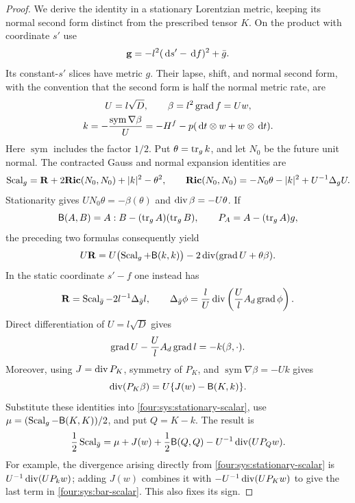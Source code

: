 \begin{proof}
We derive the identity in a stationary Lorentzian metric, keeping its
normal second form distinct from the prescribed tensor $K$.  On the
product with coordinate $s'$ use
\[
 \mathbf g=-l^2(\,\mathrm d s'-\,\mathrm d f)^2+\bar g.
\]
Its constant-$s'$ slices have metric $g$.  Their lapse, shift, and normal
second form, with the convention that the second form is half the normal
metric rate, are
\begin{equation}\label{four:sys:stationary-data}
 \begin{gathered}
 U=l\sqrt D,\qquad \beta=l^2\operatorname{grad} f=Uw,\\
 k=-\frac{\operatorname{sym}\nabla\beta}{U}
   =-H^f-p(\,\mathrm d t\otimes w+w\otimes\,\mathrm d t).
 \end{gathered}
\end{equation}
Here $\operatorname{sym}$ includes the factor $1/2$.  Put
$\theta=\operatorname{tr}_gk$, and let $N_0$ be the future unit normal.  The contracted
Gauss and normal expansion identities are
\[
 \operatorname{Scal}_g=\mathbf R+2\mathbf{Ric}(N_0,N_0)
                 +|k|^2-\theta^2,\qquad
 \mathbf{Ric}(N_0,N_0)=-N_0\theta-|k|^2+U^{-1}\Delta_gU.
\]
Stationarity gives $UN_0\theta=-\beta(\theta)$ and
$\operatorname{div}\beta=-U\theta$.  If
\[
 \mathsf B(A,B)=A:B-(\operatorname{tr}_gA)(\operatorname{tr}_gB),\qquad
 P_A=A-(\operatorname{tr}_gA)g,
\]
the preceding two formulas consequently yield
\begin{equation}\label{four:sys:stationary-scalar}
 U\mathbf R=U\bigl(\operatorname{Scal}_g+\mathsf B(k,k)\bigr)
                   -2\operatorname{div}(\operatorname{grad} U+\theta\beta).
\end{equation}
In the static coordinate $s'-f$ one instead has
\[
 \mathbf R=\operatorname{Scal}_{\bar g}-2l^{-1}\Delta_{\bar g}l,\qquad
 \Delta_{\bar g}\phi=\frac lU\operatorname{div}\left(\frac UlA_d\operatorname{grad}\phi\right).
\]
Direct differentiation of $U=l\sqrt D$ gives
\[
 \operatorname{grad} U-\frac UlA_d\operatorname{grad} l=-k(\beta,\cdot).
\]
Moreover, using $J=\operatorname{div} P_K$, symmetry of $P_K$, and
$\operatorname{sym}\nabla\beta=-Uk$ gives
\[
 \operatorname{div}(P_K\beta)=U\{J(w)-\mathsf B(K,k)\}.
\]
Substitute these identities into \eqref{four:sys:stationary-scalar}, use
$\mu=(\operatorname{Scal}_g-\mathsf B(K,K))/2$, and put $Q=K-k$.  The result is
\begin{equation}\label{four:sys:bar-scalar}
 \frac12\operatorname{Scal}_{\bar g}
  =\mu+J(w)+\frac12\mathsf B(Q,Q)
       -U^{-1}\operatorname{div}(UP_Qw).
\end{equation}
For example, the divergence arising directly from
\eqref{four:sys:stationary-scalar} is $U^{-1}\operatorname{div}(UP_kw)$;
adding $J(w)$ combines it with $-U^{-1}\operatorname{div}(UP_Kw)$ to give the
last term in \eqref{four:sys:bar-scalar}.  This also fixes its sign.


\end{proof}
